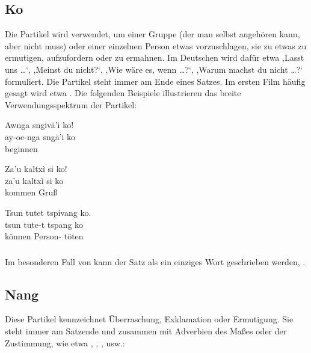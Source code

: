 \subsection{Ko} Die Partikel  wird verwendet, um einer Gruppe (der man selbst angehören kann, aber nicht muss) oder einer einzelnen Person etwas vorzuschlagen, sie zu etwas zu ermutigen, aufzufordern oder zu ermahnen. Im Deutschen wird dafür etwa ,Lasst uns \dots‘, ,Meinst du nicht?‘, ,Wie wäre es, wenn \dots?‘, ,Warum machst du nicht \dots?‘ formuliert. Die Partikel steht immer am Ende eines Satzes. Im ersten Film häufig gesagt wird etwa  . Die folgenden Beispiele illustrieren das breite Verwendungsspektrum der Partikel:

\begin{interlin}
	\glll \Npawl{}Awnga sngivä'i ko! \\
	ay-oe-nga sngä'i ko \\
	 beginnen  \\
\end{interlin}

\begin{interlin}
	\glll \Npawl{}Za'u kaltxì si ko! \\
	za'u kaltxì si ko \\
	kommen Gruß   \\
\end{interlin}

\begin{interlin}
	\glll \Npawl{}Tsun tutet tspivang ko. \\
	tsun tute-t tspang ko \\
	können Person- töten  \\
\end{interlin}
\label{syn:particle:ko}

\subsubsection{} Im besonderen Fall von   kann der Satz als ein einziges Wort geschrieben werden, .

\subsection{Nang} Diese Partikel kennzeichnet Überraschung, Exklamation oder Ermutigung. Sie steht immer am Satzende und zusammen mit Adverbien des Maßes oder der Zustimmung, wie etwa , , , usw.:

